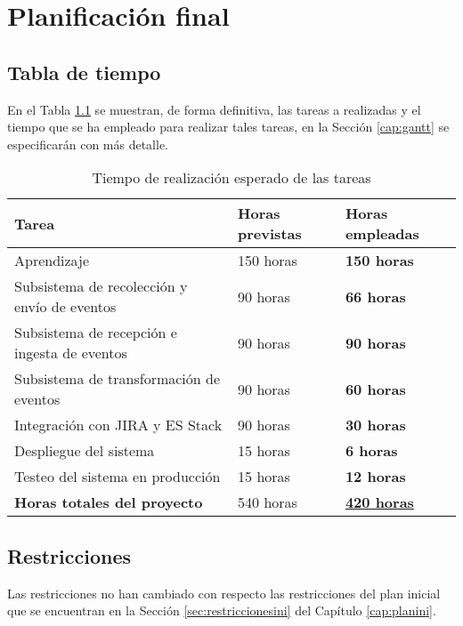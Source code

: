 \chapter{Planificación final}\label{cap:planificacion}


\section{Tabla de tiempo}
En el Tabla \ref{tabla:tiempotareas} se muestran, de forma definitiva, las tareas a realizadas y el tiempo que se ha empleado para realizar tales tareas, en la Sección \ref{cap:gantt} se especificarán con más detalle.

\begin{table}[H]\label{tabla:tiempotareas}
	\centering
	\begin{tabular}{|l|l|l|}
		\hline
		\textbf{Tarea}                               & \textbf{Horas previstas} & \textbf{Horas empleadas}       \\ \hline
		Aprendizaje                                  & 150 horas                & \textbf{150 horas}             \\ \hline
		Subsistema de recolección y envío de eventos & 90 horas                 & \textbf{66 horas}              \\ \hline
		Subsistema de recepción e ingesta de eventos & 90 horas                 & \textbf{90 horas}              \\ \hline
		Subsistema de transformación de eventos      & 90 horas                 & \textbf{60 horas}              \\ \hline
		Integración con JIRA y ES Stack              & 90 horas                 & \textbf{30 horas}              \\ \hline
		Despliegue del sistema                       & 15 horas                 & \textbf{6 horas}               \\ \hline
		Testeo del sistema en producción             & 15 horas                 & \textbf{12 horas}              \\ \hline
		\textbf{Horas totales del proyecto}          & 540 horas                & \underline{\textbf{420 horas}} \\ \hline
	\end{tabular}
	\caption{Tiempo de realización esperado de las tareas}
\end{table}

\section{Restricciones}
Las restricciones no han cambiado con respecto las restricciones del plan inicial que se encuentran en la Sección \ref{sec:restriccionesini} del Capítulo \ref{cap:planini}.

